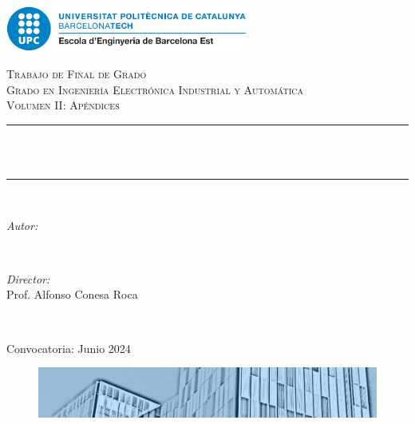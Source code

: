 \begin{titlepage}

\newcommand{\HRule}{\rule{\linewidth}{0.5mm}} %

\centering
\includegraphics[width=8cm]{fig/eebe.png}\\[1cm] 
 
\center 

\textsc{\LARGE Trabajo de Final de Grado}\\[1.5cm] 
\textsc{\Large Grado en Ingeniería Electrónica Industrial y Automática}\\[0.5cm] 
\textsc{\large Volumen II: Apéndices}\\[0.5cm] 

\makeatletter
\HRule \\[0.4cm]
{ \huge \bfseries \@title}\\[0.4cm] %
\HRule \\[1.5cm]
 

\begin{minipage}{0.4\textwidth}
\begin{flushleft} \large
\emph{Autor:}\\
\@author 


\end{flushleft}
\end{minipage}
~
\begin{minipage}{0.4\textwidth}
\begin{flushright} \large
\emph{Director:} \\
Prof. Alfonso Conesa Roca \\[1.2em] 
\end{flushright}
\end{minipage}\\[2cm]
\makeatother


{\large Convocatoria: Junio 2024}\\[2cm]

\begin{figure}[H]
\centering
  \includegraphics[width=15cm]{fig/portada-uni.png}
\end{figure}
\end{titlepage}

\vfill %